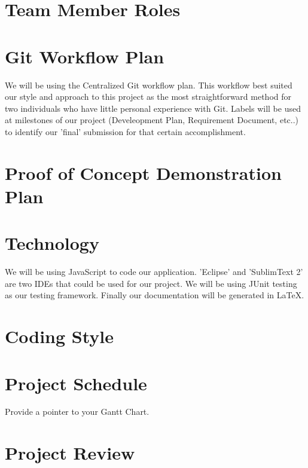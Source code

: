 \documentclass{article}
\begin{document}
	\section{Team Member Roles}
	
	\section{Git Workflow Plan}
	
	We will be using the Centralized Git workflow plan. This workflow best suited our style 
	and approach to this project as the most straightforward method for two individuals 
	who have little personal experience with Git. Labels will be used at milestones of our 
	project (Develeopment Plan, Requirement Document, etc..) to identify our 'final' 
	submission for that certain accomplishment. 
	
	\section{Proof of Concept Demonstration Plan}
	
	\section{Technology}
	
	We will be using JavaScript to code our application. 'Eclipse' and 'SublimText 2' are two 
	IDEs that could be used for our project. We will be using JUnit testing as our testing 
	framework. Finally our documentation will be generated in LaTeX.
	
	\section{Coding Style}
	
	\section{Project Schedule}
	
	Provide a pointer to your Gantt Chart.
	
	\section{Project Review}
	
\end{document}
